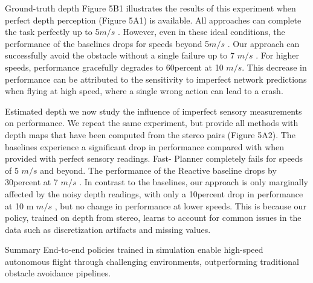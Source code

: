 \documentclass{beamer}
\begin{document}
\begin{frame}{Ground-truth depth}
	Figure 5B1 illustrates the results of this experiment when perfect depth perception (Figure 5A1) is available. All approaches can complete the task perfectly up to 5$m/s$ . However, even in these ideal conditions, the performance of the baselines drops for speeds beyond 5$m/s$ . Our approach can successfully avoid the obstacle without a single failure up to 7 $m/s$ . For higher speeds, performance gracefully degrades to 60percent at 10 $m/s$. This decrease in performance can be attributed to the sensitivity to imperfect network predictions when flying at high speed, where a single wrong action can lead to a crash. 
\end{frame}

\begin{frame}{Estimated depth}
	we now study the influence of imperfect sensory measurements on performance. We repeat the same experiment, but provide all methods with depth maps that have been computed from
	the stereo pairs (Figure 5A2). The baselines experience a significant drop in performance compared with when provided with perfect sensory readings. Fast- Planner completely fails for speeds of 5 $m/s$ and beyond. The performance of the Reactive baseline drops by 30percent at 7 $m/s$ .  In contrast to the baselines, our approach is only marginally affected by the noisy depth readings, with only a 10percent drop in performance at 10 m $m/s$ , but no change in performance at lower speeds. This is because our policy, trained on depth from stereo, learns to account for common issues in the data such as discretization artifacts and missing values.
	
\end{frame}

\begin{frame}{Summary}
	End-to-end policies trained in simulation enable high-speed autonomous flight through challenging environments, outperforming traditional obstacle avoidance pipelines.
\end{frame}
\end{document}
